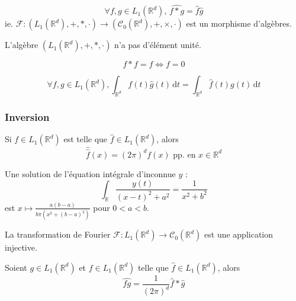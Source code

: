
	\begin{proposition}
		\[ \forall f, g \in L_1(\mathbb{R}^d), \, \widehat{f * g} = \widehat{f} \widehat{g} \]
		ie. $\mathcal{F} : (L_1(\mathbb{R}^d), +, *, \cdot) \rightarrow (\mathcal{C}_0(\mathbb{R}^d), +, \times, \cdot)$ est un morphisme d'algèbres.
	\end{proposition}

	\begin{corollary}
		L'algèbre $(L_1(\mathbb{R}^d), +, *, \cdot)$ n'a pas d'élément unité.
	\end{corollary}

	\begin{application}
		\[ f * f = f \iff f = 0 \]
	\end{application}

	\begin{theorem}
		\[ \forall f, g \in L_1(\mathbb{R}^d), \int_{\mathbb{R}^d} f(t) \widehat{g}(t) \, \mathrm{d}t = \int_{\mathbb{R}^d} \widehat{f}(t) g(t) \, \mathrm{d}t \]
	\end{theorem}

	\subsubsection{Inversion}

	\begin{theorem}
		Si $f \in L_1(\mathbb{R}^d)$ est telle que $\widehat{f} \in L_1(\mathbb{R}^d)$, alors
		\[ \widehat{\widehat{f}}(x) = (2\pi)^d f(x) \text{ pp. en } x \in \mathbb{R}^d \]
	\end{theorem}

	\begin{example}
		Une solution de l'équation intégrale d'inconnue $y$ :
		\[ \int_{\mathbb{R}} \frac{y(t)}{(x-t)^2 + a^2} = \frac{1}{x^2 + b^2} \]
		est $x \mapsto \frac{a(b-a)}{b \pi (x^2 + (b-a)^2)}$ pour $0 < a < b$.
	\end{example}

	\begin{corollary}
		La transformation de Fourier $\mathcal{F} : L_1(\mathbb{R}^d) \rightarrow \mathcal{C}_0(\mathbb{R}^d)$ est une application injective.
	\end{corollary}

	\begin{proposition}
		Soient $g \in L_1(\mathbb{R}^d)$ et $f \in L_1(\mathbb{R}^d)$ telle que $\widehat{f} \in L_1(\mathbb{R}^d)$, alors
		\[ \widehat{fg} = \frac{1}{(2\pi)^d} \widehat{f} * \widehat{g} \]
	\end{proposition}

